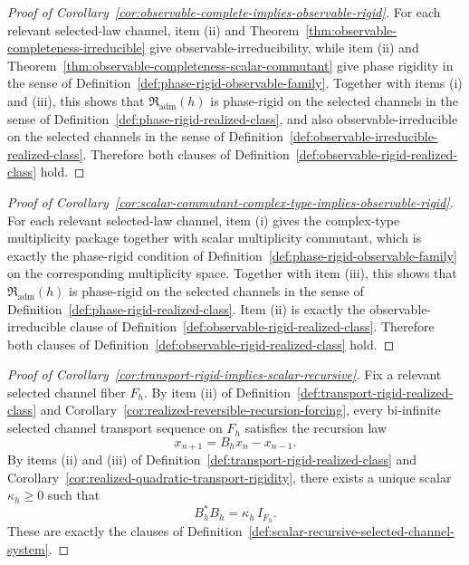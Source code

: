 \begin{proof}[Proof of Corollary~\ref{cor:observable-complete-implies-observable-rigid}]
\label{proof:cor:observable-complete-implies-observable-rigid}
For each relevant selected-law channel, item (ii) and
Theorem~\ref{thm:observable-completeness-irreducible} give
observable-irreducibility, while item (ii) and
Theorem~\ref{thm:observable-completeness-scalar-commutant} give phase rigidity
in the sense of Definition~\ref{def:phase-rigid-observable-family}. Together
with items (i) and (iii), this shows that
$\mathfrak R_{\mathrm{adm}}(h)$ is phase-rigid on the selected channels in the
sense of Definition~\ref{def:phase-rigid-realized-class}, and also
observable-irreducible on the selected channels in the sense of
Definition~\ref{def:observable-irreducible-realized-class}. Therefore both
clauses of Definition~\ref{def:observable-rigid-realized-class} hold.
\end{proof}

\begin{proof}[Proof of Corollary~\ref{cor:scalar-commutant-complex-type-implies-observable-rigid}]
\label{proof:cor:scalar-commutant-complex-type-implies-observable-rigid}
For each relevant selected-law channel, item (i) gives the complex-type
multiplicity package together with scalar multiplicity commutant, which is
exactly the phase-rigid condition of
Definition~\ref{def:phase-rigid-observable-family} on the corresponding
multiplicity space. Together with item (iii), this shows that
$\mathfrak R_{\mathrm{adm}}(h)$ is phase-rigid on the selected channels in the
sense of Definition~\ref{def:phase-rigid-realized-class}. Item (ii) is exactly
the observable-irreducible clause of
Definition~\ref{def:observable-rigid-realized-class}. Therefore both clauses
of Definition~\ref{def:observable-rigid-realized-class} hold.
\end{proof}

\begin{proof}[Proof of Corollary~\ref{cor:transport-rigid-implies-scalar-recursive}]
\label{proof:cor:transport-rigid-implies-scalar-recursive}
Fix a relevant selected channel fiber $F_h$. By item (ii) of
Definition~\ref{def:transport-rigid-realized-class} and
Corollary~\ref{cor:realized-reversible-recursion-forcing}, every bi-infinite
selected channel transport sequence on $F_h$ satisfies the recursion law
\[
x_{n+1}=B_hx_n-x_{n-1}.
\]
By items (ii) and (iii) of
Definition~\ref{def:transport-rigid-realized-class} and
Corollary~\ref{cor:realized-quadratic-transport-rigidity}, there exists a
unique scalar $\kappa_h\ge 0$ such that
\[
B_h^*B_h=\kappa_h\,I_{F_h}.
\]
These are exactly the clauses of
Definition~\ref{def:scalar-recursive-selected-channel-system}.
\end{proof}

